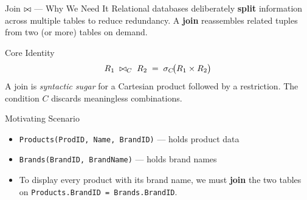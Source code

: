 \begin{frame}{Join $\bowtie$ --- Why We Need It}
  Relational databases deliberately \textbf{split} information across multiple
  tables to reduce redundancy.  A \textbf{join} reassembles related tuples from
  two (or more) tables on demand.

  \begin{block}{Core Identity}
    \[
      R_1 \;\bowtie_C\; R_2 \;=\; \sigma_C\!\bigl(R_1 \times R_2\bigr)
    \]
    A join is \emph{syntactic sugar} for a Cartesian product followed by a
    restriction.  The condition $C$ discards meaningless combinations.
  \end{block}

  \begin{examples}{Motivating Scenario}
    \begin{itemize}
      \item \texttt{Products(ProdID, Name, BrandID)} ---  holds product data
      \item \texttt{Brands(BrandID, BrandName)} --- holds brand names
      \item To display every product with its brand name, we must
            \textbf{join} the two tables on \texttt{Products.BrandID = Brands.BrandID}.
    \end{itemize}
  \end{examples}
\end{frame}

